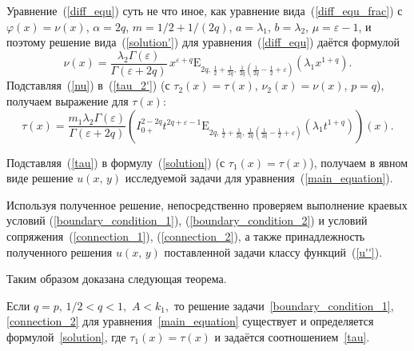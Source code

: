 Уравнение~(\ref{diff_equ})  суть не что иное, как уравнение вида~(\ref{diff_equ_frac}) с $\varphi(x)=\nu(x)$,
$\alpha=2q$, $m={1}/{2}+{1}/({2q})$, $a=\lambda_1$, $b=\lambda_2$, $\mu=\varepsilon-1$,
и поэтому решение вида~(\ref{solution'}) для уравнения~(\ref{diff_equ}) даётся формулой
\begin{equation}\label{nu}
    \nu(x)=\frac{\lambda_2\Gamma(\varepsilon)}{\Gamma(\varepsilon+2q)}\,x^{\varepsilon+q}\mathrm{E}_{2q,\,\frac{1}{2}+\frac{1}{2q},\,\frac{1}{2q}\left(\frac{1}{2q}-\frac{1}{2}+\varepsilon\right)}(\lambda_1x^{1+q}).
\end{equation}
Подставляя~(\ref{nu}) в~(\ref{tau_2'}) (с $\tau_2(x)=\tau(x)$, $\nu_2(x)=\nu(x)$, $p=q$),
получаем выражение для $\tau(x)$:
\begin{equation}\label{tau}
    \tau(x)=\frac{m_1\lambda_2\Gamma(\varepsilon)}{\Gamma(\varepsilon+2q)}\left(I_{0+}^{2-2q}t^{2q+\varepsilon-1}\mathrm{E}_{2q,\,\frac{1}{2}+\frac{1}{2q},\,\frac{1}{2q}\left(\frac{1}{2q}-\frac{1}{2}+\varepsilon\right)}(\lambda_1t^{1+q})\right)(x).
\end{equation}

Подставляя~(\ref{tau}) в формулу~(\ref{solution}) (с $\tau_1(x)=\tau(x)$), получаем в явном виде решение
$u(x,\,y)$ исследуемой задачи для уравнения~(\ref{main_equation}).

Используя полученное решение, непосредственно проверяем выполнение краевых условий (\ref{boundary_condition_1}), (\ref{boundary_condition_2}) и условий сопряжения~(\ref{connection_1}), (\ref{connection_2}),
а также принадлежность полученного решения $u(x,\,y)$ поставленной задачи классу функций~(\ref{u''}).

Таким образом доказана следующая теорема.
\smallskip

\begin{theorem}[2] Если $q=p$, ${1}/{2}<q<1,$ $A<k_1,$ то решение задачи~\eqref{boundary_condition_1}{\rm,} \eqref{connection_2} для уравнения~\eqref{main_equation} существует и определяется формулой~\eqref{solution}{\rm,} где $\tau_1(x)=\tau(x)$ и задаётся соотношением~\eqref{tau}\rm. \end{theorem}




